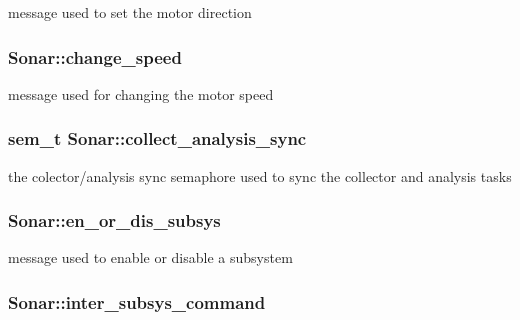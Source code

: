 message used to set the motor direction \hypertarget{classSonar_a44a265ac2b363cdd0e944285a7c07eb8}{
\subsubsection[{change\-\_\-speed}]{ Sonar\-::change\-\_\-speed\hspace{0.3cm}{\ttfamily [protected]}}}\label{classSonar_a44a265ac2b363cdd0e944285a7c07eb8}
message used for changing the motor speed \hypertarget{classSonar_a3dcf7c38af34539c68f123f073eb2f52}{
\subsubsection[{collect\-\_\-analysis\-\_\-sync}]{\setlength{\rightskip}{0pt plus 5cm}sem\-\_\-t Sonar\-::collect\-\_\-analysis\-\_\-sync\hspace{0.3cm}{\ttfamily [protected]}}}\label{classSonar_a3dcf7c38af34539c68f123f073eb2f52}
the colector/analysis sync semaphore used to sync the collector and analysis tasks \hypertarget{classSonar_a403e0e1741cb9ff1872dbe74a7c701d6}{
\subsubsection[{en\-\_\-or\-\_\-dis\-\_\-subsys}]{ Sonar\-::en\-\_\-or\-\_\-dis\-\_\-subsys\hspace{0.3cm}{\ttfamily [protected]}}}\label{classSonar_a403e0e1741cb9ff1872dbe74a7c701d6}
message used to enable or disable a subsystem \hypertarget{classSonar_a27d83a5a5c4859adb65641683e964018}{
\subsubsection[{inter\-\_\-subsys\-\_\-command}]{ Sonar\-::inter\-\_\-subsys\-\_\-command\hspace{0.3cm}{\ttfamily [protected]}}}\label{classSonar_a27d83a5a5c4859adb65641683e964018}
